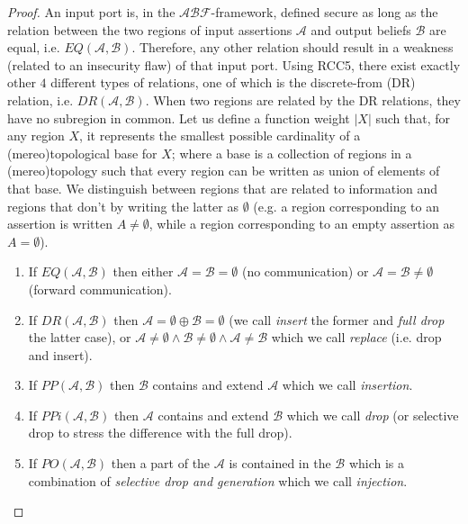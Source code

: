 \documentclass[conference]{IEEEtran}
\newcommand{\fixnote}[2]{\textbf{\color{red}{FIX}}\footnote{{\bf #1:} #2}}
\newcommand{\assertionRegion}{\mathcal{A}}
\newcommand{\beliefRegion}{\mathcal{B}}
\newcommand{\factRegion}{\mathcal{F}}
\newcommand{\abftheory}{\assertionRegion\beliefRegion\factRegion}
\newcommand{\eq}[2]{EQ(#1,#2)}
\newcommand{\pp}[2]{PP(#1,#2)}
\newcommand{\po}[2]{PO(#1,#2)}
\newcommand{\ppi}[2]{PPi(#1,#2)}
\newcommand{\dr}[2]{DR(#1,#2)}
\begin{document}
\begin{proof}
An input port is, in the $\abftheory$-framework, defined secure as long as the relation
	between the two regions of input assertions $\assertionRegion$ and
	output beliefs $\beliefRegion$ are equal, i.e.
	$\eq{\assertionRegion}{\beliefRegion}$. Therefore, any other relation
	should result in a weakness (related to an insecurity flaw) of that
	input port.  Using RCC5, there exist exactly other $4$ different types
	of relations, one of which is the discrete-from (DR) relation, i.e.
	$\dr{\assertionRegion}{\beliefRegion}$. When two regions are related by
	the DR relations, they have no subregion in common. Let us
	define a function weight $|X|$ such that, for any region $X$, it
	represents the smallest possible cardinality of a (mereo)topological base for
	$X$; where a base is a collection of regions in a (mereo)topology such that
	every region can be written as union of elements of that base. 
	We distinguish between regions that are related to information and regions that
	don't by writing the latter as $\emptyset$ (e.g. a region corresponding to
	an assertion is written $A\neq\emptyset$, while a region corresponding to an empty assertion
	as $A=\emptyset$).
	\begin{enumerate}
		\item If $\eq{\assertionRegion}{\beliefRegion}$ then either
			$\assertionRegion=\beliefRegion=\emptyset$ (no
			communication) or
			$\assertionRegion=\beliefRegion\neq\emptyset$ (forward
			communication).
		\item If $\dr{\assertionRegion}{\beliefRegion}$ then
			$\assertionRegion=\emptyset\oplus\beliefRegion=\emptyset$
			(we call \emph{insert} the former and \emph{full drop}
			the latter case), or
			$\assertionRegion\neq\emptyset\wedge\beliefRegion\neq\emptyset\wedge\assertionRegion\neq\beliefRegion$
			which we call \emph{replace} (i.e. drop and insert).
		\item If $\pp{\assertionRegion}{\beliefRegion}$ then
			$\beliefRegion$ contains and extend $\assertionRegion$
			which we call \emph{insertion}.
		\item If $\ppi{\assertionRegion}{\beliefRegion}$ then
			$\assertionRegion$ contains and extend $\beliefRegion$
			which we call \emph{drop} (or selective drop to stress the difference with the full drop).
		\item If $\po{\assertionRegion}{\beliefRegion}$ then a part of
			the $\assertionRegion$ is contained in the
			$\beliefRegion$ which is a combination of
			\emph{selective drop and generation} which we call \emph{injection}.
	\end{enumerate}
\end{proof}
\end{document}
